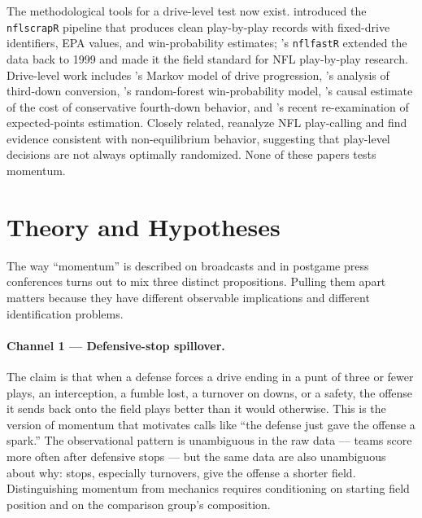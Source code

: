 \documentclass[11pt]{article}
\begin{document}
The methodological tools for a drive-level test now exist.
\citet{yurko2018nflwar} introduced the \texttt{nflscrapR} pipeline that
produces clean play-by-play records with fixed-drive identifiers, EPA values,
and win-probability estimates; \citet{nflfastr2024}'s \texttt{nflfastR}
extended the data back to 1999 and made it the field standard for NFL
play-by-play research. Drive-level work includes
\citet{goldner2012markov}'s Markov model of drive progression,
\citet{cafarelli2012third}'s analysis of third-down conversion,
\citet{lock2014random}'s random-forest win-probability model,
\citet{yam2019what}'s causal estimate of the cost of conservative fourth-down
behavior, and \citet{brill2024expected}'s recent re-examination of
expected-points estimation. Closely related, \citet{kovash2009professional}
reanalyze NFL play-calling and find evidence consistent with non-equilibrium
behavior, suggesting that play-level decisions are not always optimally
randomized. None of these papers tests momentum.

\section{Theory and Hypotheses}\label{sec:theory}

The way ``momentum'' is described on broadcasts and in postgame press
conferences turns out to mix three distinct propositions. Pulling them apart
matters because they have different observable implications and different
identification problems.

\paragraph{Channel 1 --- Defensive-stop spillover.} The claim is that when
a defense forces a drive ending in a punt of three or fewer plays, an
interception, a fumble lost, a turnover on downs, or a safety, the offense
it sends back onto the field plays better than it would otherwise. This is
the version of momentum that motivates calls like ``the defense just gave the
offense a spark.'' The observational pattern is unambiguous in the raw data
--- teams score more often after defensive stops --- but the same data are
also unambiguous about why: stops, especially turnovers, give the offense a
shorter field. Distinguishing momentum from mechanics requires conditioning
on starting field position and on the comparison group's composition.
\end{document}
